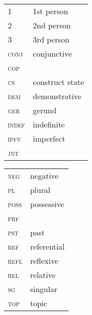 \documentclass[output=paper]{LSP/langsci}
\begin{document}
\section*{}


\begin{tabularx}{.45\textwidth}{>{\scshape}lQ}
1 & 1st person \\
2 & 2nd person   \\
3 &  3rd person  \\
conj &  conjunctive  \\
cop &    \\
cs &  construct state  \\
dem &  demonstrative  \\
ger &  gerund  \\
indef &  indefinite  \\
ipfv &  imperfect  \\
jnt &    \\
\end{tabularx}
\begin{tabularx}{.45\textwidth}{>{\scshape}lQ}
neg &  negative  \\
pl &  plural  \\
poss &  possessive  \\
prf &    \\
pst &  past  \\
ref &  referential  \\
refl &  reflexive  \\
rel &   relative \\
sg &  singular  \\
top &   topic \\
\end{tabularx}

\sloppy
\printbibliography[heading=subbibliography,notkeyword=this]
\end{document}
